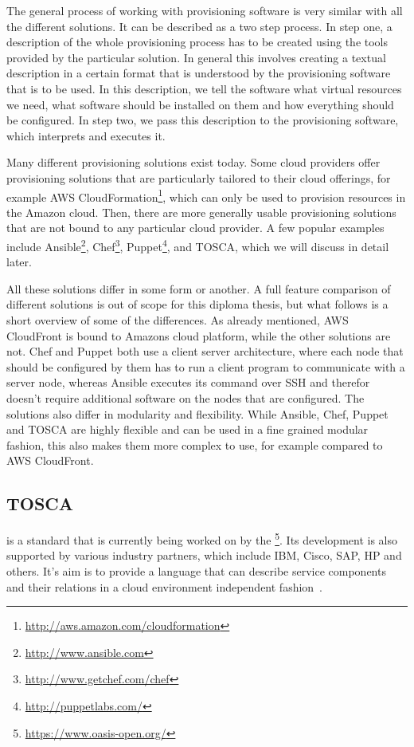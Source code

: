The general process of working with provisioning software is very similar with all the different solutions.
It can be described as a two step process.
In step one, a description of the whole provisioning process has to be created using the tools provided by the particular solution.
In general this involves creating a textual description in a certain format that is understood by the provisioning software that is to be used.
In this description, we tell the software what virtual resources we need, what software should be installed on them and how everything should be configured.
In step two, we pass this description to the provisioning software, which interprets and executes it.

Many different provisioning solutions exist today.
Some cloud providers offer provisioning solutions that are particularly tailored to their cloud offerings, for example AWS CloudFormation\footnote{\url{http://aws.amazon.com/cloudformation}}, which can only be used to provision resources in the Amazon cloud.
Then, there are more generally usable provisioning solutions that are not bound to any particular cloud provider.
A few popular examples include Ansible\footnote{\url{http://www.ansible.com}}, Chef\footnote{\url{http://www.getchef.com/chef}}, Puppet\footnote{\url{http://puppetlabs.com/}}, and TOSCA, which we will discuss in detail later.

All these solutions differ in some form or another.
A full feature comparison of different solutions is out of scope for this diploma thesis, but what follows is a short overview of some of the differences.
As already mentioned, AWS CloudFront is bound to Amazons cloud platform, while the other solutions are not.
Chef and Puppet both use a client server architecture, where each node that should be configured by them has to run a client program to communicate with a server node, whereas Ansible executes its command over SSH and therefor doesn't require additional software on the nodes that are configured.
The solutions also differ in modularity and flexibility. While Ansible, Chef, Puppet and TOSCA are highly flexible and can be used in a fine grained modular fashion, this also makes them more complex to use, for example compared to AWS CloudFront.

\subsection{TOSCA}

 is a standard that is currently being worked on by the \footnote{\url{https://www.oasis-open.org/}}.
Its development is also supported by various industry partners, which include IBM, Cisco, SAP, HP and others.
It's aim is to provide a language that can describe service components and their relations in a cloud environment independent fashion~\autocite{tosca:spec}.

